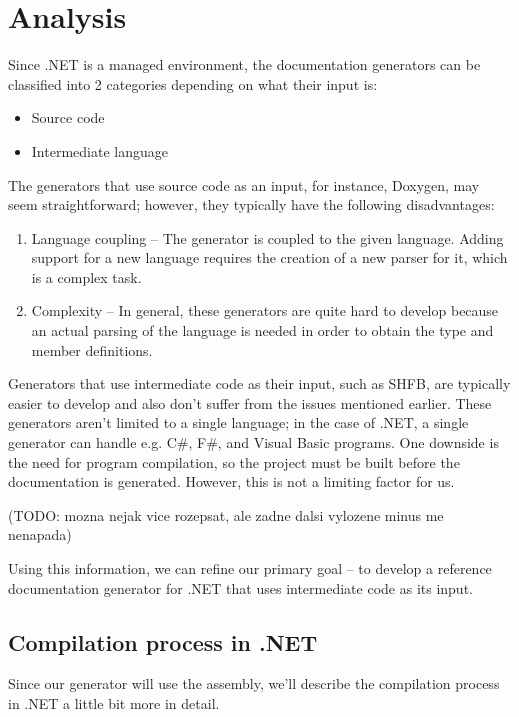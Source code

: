 \chapter{Analysis}


Since .NET is a managed environment, the documentation generators can be classified into 2 categories depending on what their input is:

\begin{itemize}
    \item Source code
    \item Intermediate language
\end{itemize}

The generators that use source code as an input, for instance, Doxygen, may seem straightforward; however, they typically have the following disadvantages:
\begin{enumerate}
    \item Language coupling -- The generator is coupled to the given language. 
    Adding support for a new language requires the creation of a new parser for it, which is a complex task.
    \item Complexity -- In general, these generators are quite hard to develop because an actual parsing of the language is needed in order to obtain the type and member definitions.
\end{enumerate}

Generators that use intermediate code as their input, such as SHFB, are typically easier to develop and also don't suffer from the issues mentioned earlier.
These generators aren't limited to a single language; in the case of .NET, a single generator can handle e.g. C\#, F\#, and Visual Basic programs. 
One downside is the need for program compilation, so the project must be built before the documentation is generated.
However, this is not a limiting factor for us.

(TODO: mozna nejak vice rozepsat, ale zadne dalsi vylozene minus me nenapada)

Using this information, we can refine our primary goal -- to develop a reference
documentation generator for .NET that uses intermediate code as its input.

\section{Compilation process in .NET}

Since our generator will use the assembly, we'll describe the compilation process in .NET a little bit more in detail.

